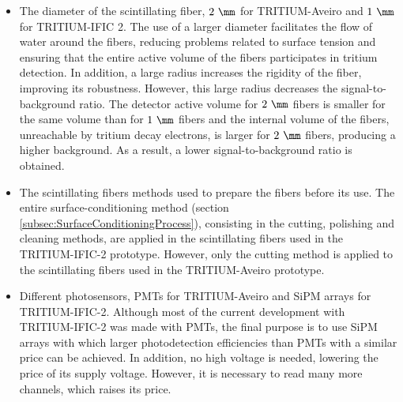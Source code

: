\begin{itemize}

\item{} The diameter of the scintillating fiber, $2~\mm$ for TRITIUM-Aveiro and $1~\mm$ for TRITIUM-IFIC 2. The use of a larger diameter facilitates the flow of water around the fibers, reducing problems related to surface tension and ensuring that the entire active volume of the fibers participates in tritium detection. In addition, a large radius increases the rigidity of the fiber, improving its robustness. However, this large radius decreases the signal-to-background ratio. The detector active volume for $2~\mm$ fibers is smaller for the same volume than for $1~\mm$ fibers and the internal volume of the fibers, unreachable by tritium decay electrons, is larger for $2~\mm$ fibers, producing a higher background. As a result, a lower signal-to-background ratio is obtained.



\item{} The scintillating fibers methods used to prepare the fibers before its use. The entire surface-conditioning method (section \ref{subsec:SurfaceConditioningProcess}), consisting in the cutting, polishing and cleaning methods, are applied in the scintillating fibers used in the TRITIUM-IFIC-2 prototype. However, only the cutting method is applied to the scintillating fibers used in the TRITIUM-Aveiro prototype.

\item{} Different photosensors, PMTs for TRITIUM-Aveiro and SiPM arrays for TRITIUM-IFIC-2. Although most of the current development with TRITIUM-IFIC-2 was made with PMTs, the final purpose is to use SiPM arrays with which larger photodetection efficiencies than PMTs with a similar price can be achieved. In addition, no high voltage is needed, lowering the price of its supply voltage. However, it is necessary to read many more channels, which raises its price.


\end{itemize}
